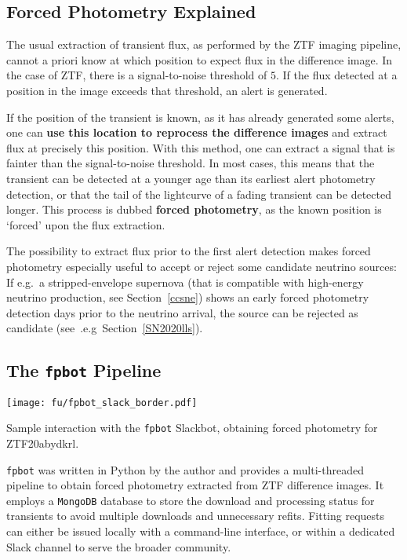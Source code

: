 \subsection{Forced Photometry Explained}
The usual extraction of transient flux, as performed by the ZTF imaging pipeline, cannot a priori know at which position to expect flux in the difference image. In the case of ZTF, there is a signal-to-noise threshold of $5$. If the flux detected at a position in the image exceeds that threshold, an alert is generated.

If the position of the transient is known, as it has already generated some alerts, one can \textbf{use this location to reprocess the difference images} and extract flux at precisely this position. With this method, one can extract a signal that is fainter than the signal-to-noise threshold. In most cases, this means that the transient can be detected at a younger age than its earliest alert photometry detection, or that the tail of the lightcurve of a fading transient can be detected longer. This process is dubbed \textbf{forced photometry}, as the known position is `forced' upon the flux extraction.

The possibility to extract flux prior to the first alert detection makes forced photometry especially useful to accept or reject some candidate neutrino sources: If e.g.\ a stripped-envelope supernova (that is compatible with high-energy neutrino production, see Section~\ref{ccsne}) shows an early forced photometry detection days prior to the neutrino arrival, the source can be rejected as candidate (see~.e.g\ Section~\ref{SN2020lls}).

\subsection{The \texttt{fpbot} Pipeline}
\begin{marginfigure}
    \texttt{[image: fu/fpbot\_slack\_border.pdf]}
    \caption[\texttt{fpbot} Slackbot interaction]{Sample interaction with the \texttt{fpbot} Slackbot, obtaining forced photometry for ZTF20abydkrl.}
\end{marginfigure}
\texttt{fpbot} was written in Python by the author and provides a multi-threaded pipeline to obtain forced photometry extracted from ZTF difference images. It employs a \texttt{MongoDB} database to store the download and processing status for transients to avoid multiple downloads and unnecessary refits. Fitting requests can either be issued locally with a command-line interface, or within a dedicated Slack channel to serve the broader community.


